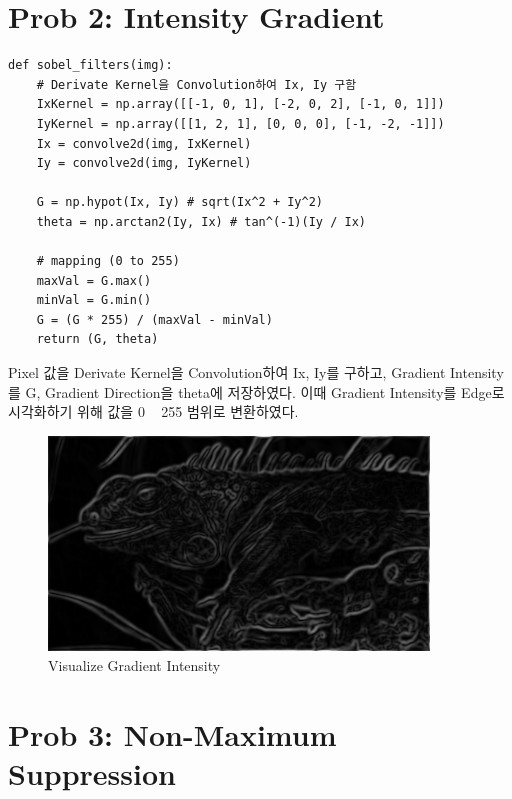 \documentclass[]{report}
\begin{document}
\section*{Prob 2: Intensity Gradient}

\begin{lstlisting}
def sobel_filters(img):
	# Derivate Kernel을 Convolution하여 Ix, Iy 구함
	IxKernel = np.array([[-1, 0, 1], [-2, 0, 2], [-1, 0, 1]])
	IyKernel = np.array([[1, 2, 1], [0, 0, 0], [-1, -2, -1]])
	Ix = convolve2d(img, IxKernel)
	Iy = convolve2d(img, IyKernel)
	
	G = np.hypot(Ix, Iy) # sqrt(Ix^2 + Iy^2)
	theta = np.arctan2(Iy, Ix) # tan^(-1)(Iy / Ix)
	
	# mapping (0 to 255)
	maxVal = G.max()
	minVal = G.min()
	G = (G * 255) / (maxVal - minVal)
	return (G, theta)
\end{lstlisting}

Pixel 값을 Derivate Kernel을 Convolution하여 Ix, Iy를 구하고, Gradient Intensity를 G, Gradient Direction을 theta에 저장하였다. 이때 Gradient Intensity를 Edge로 시각화하기 위해 값을 0 ~ 255 범위로 변환하였다. \\

\begin{figure}[ht!]
	\centering
	\includegraphics[width=0.9\textwidth]{image/problem2.png}
	\caption{Visualize Gradient Intensity}
	\label{problem2}
\end{figure}

\section*{Prob 3: Non-Maximum Suppression}
\end{document}
